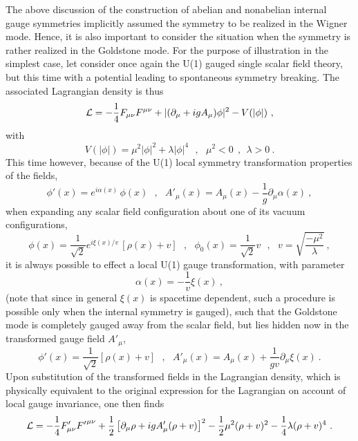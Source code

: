 \documentclass[a4paper,11pt]{article}
\begin{document}
The above discussion of the construction of abelian and nonabelian internal
gauge symmetries implicitly assumed the symmetry to be realized in the Wigner
mode. Hence, it is also important to consider the situation when the
symmetry is rather realized in the Goldstone mode. For the purpose
of illustration in the simplest case, let consider once again the
U(1) gauged single scalar field theory, but this time with a potential
leading to spontaneous symmetry breaking. The associated Lagrangian
density is thus
\begin{equation}
{\cal L}=-\frac{1}{4}F_{\mu\nu}F^{\mu\nu}+|(\partial_\mu+igA_\mu)\phi|^2-
V(|\phi|)\ ,
\end{equation}
with
\begin{equation}
V(|\phi|)=\mu^2|\phi|^2+\lambda|\phi|^4\ \ \ ,\ \ \ 
\mu^2<0\ \ ,\ \ \lambda>0\ .
\end{equation}
This time however, because of the U(1) local symmetry transformation 
pro\-per\-ties of the fields,
\begin{equation}
\phi'(x)=e^{i\alpha(x)}\,\phi(x)\ \ \ ,\ \ \ 
A'_\mu(x)=A_\mu(x)-\frac{1}{g}\partial_\mu\alpha(x)\ ,
\end{equation}
when expanding any scalar field configuration about one of its vacuum
configurations,
\begin{equation}
\phi(x)=\frac{1}{\sqrt{2}}e^{i\xi(x)/v}\,\left[\rho(x)+v\right]\ \ \ ,\ \ \ 
\phi_0(x)=\frac{1}{\sqrt{2}}v\ \ \ ,\ \ \ 
v=\sqrt{\frac{-\mu^2}{\lambda}}\ ,
\end{equation}
it is always possible to effect a local U(1) gauge transformation, with
pa\-ra\-me\-ter
\begin{equation}
\alpha(x)=-\frac{1}{v}\xi(x)\ ,
\end{equation}
(note that since in general $\xi(x)$ is spacetime dependent, such a
procedure is possible only when the internal symmetry is gauged),
such that the Goldstone mode is completely gauged away from the scalar field,
but lies hidden now in the transformed gauge field $A'_\mu$,
\begin{equation}
\phi'(x)=\frac{1}{\sqrt{2}}\left[\rho(x)+v\right]\ \ \ ,\ \ \ 
A'_\mu(x)=A_\mu(x)+\frac{1}{gv}\partial_\mu\xi(x)\ .
\label{eq:Higgs}
\end{equation}
Upon substitution of the transformed fields in the Lagrangian density, 
which is physically equivalent to the original expression for the Lagrangian 
on account of local gauge invariance, one then finds
\begin{equation}
{\cal L}=-\frac{1}{4}F'_{\mu\nu}{F'}^{\mu\nu}+
\frac{1}{2}\left[\partial_\mu\rho+igA'_\mu(\rho+v)\right]^2-
\frac{1}{2}\mu^2(\rho+v)^2-\frac{1}{4}\lambda(\rho+v)^4\ .
\end{equation}
\end{document}
